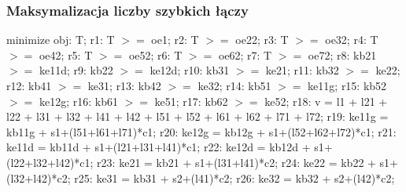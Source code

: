 \documentclass[a4paper,11pt, titlepage]{article}
\begin{document}
\subsubsection{Maksymalizacja liczby szybkich łączy}

\begin{flushleft}
minimize obj: T;\linebreak
\linebreak
r1: T $>=$ oe1;\linebreak
r2: T $>=$ oe22;\linebreak
r3: T $>=$ oe32;\linebreak
r4: T $>=$ oe42;\linebreak
r5: T $>=$ oe52;\linebreak
r6: T $>=$ oe62;\linebreak
r7: T $>=$ oe72;\linebreak
\linebreak
r8: kb21 $>=$ ke11d;\linebreak
r9: kb22 $>=$ ke12d;\linebreak
r10: kb31 $>=$ ke21;\linebreak
r11: kb32 $>=$ ke22;\linebreak
r12: kb41 $>=$ ke31;\linebreak
r13: kb42 $>=$ ke32;\linebreak
r14: kb51 $>=$ ke11g;\linebreak
r15: kb52 $>=$ ke12g;\linebreak
r16: kb61 $>=$ ke51;\linebreak
r17: kb62 $>=$ ke52;\linebreak
\linebreak
r18: v = l1 + l21 + l22 + l31 + l32 + l41 + l42 + l51 + l52 + l61 + l62 + l71 + l72;\linebreak
\linebreak
r19: ke11g = kb11g + s1+(l51+l61+l71)*c1;\linebreak
r20: ke12g = kb12g + s1+(l52+l62+l72)*c1;\linebreak
r21: ke11d = kb11d + s1+(l21+l31+l41)*c1;\linebreak
r22: ke12d = kb12d + s1+(l22+l32+l42)*c1;\linebreak
r23: ke21 = kb21 + s1+(l31+l41)*c2;\linebreak
r24: ke22 = kb22 + s1+(l32+l42)*c2;\linebreak
r25: ke31 = kb31 + s2+(l41)*c2;\linebreak
r26: ke32 = kb32 + s2+(l42)*c2;\linebreak

\end{flushleft}
\end{document}
